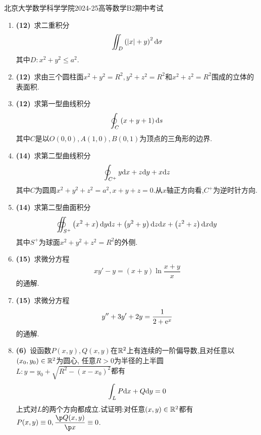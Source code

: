 \documentclass{ctexart}
\begin{document}
\pagestyle{empty}
\begin{center}\Large
    北京大学数学科学学院2024-25高等数学B2期中考试
\end{center}
\begin{enumerate}[leftmargin=*,label=\textbf{\arabic*.}]
    \item \textbf{(12)}\ 求二重积分
    \[\iint_{D}\left(|x|+y\right)^2\mathrm{d}\sigma\]
    其中$D:x^2+y^2\leqslant a^2$.

    \item \textbf{(12)}\ 求由三个圆柱面$x^2+y^2=R^2,y^2+z^2=R^2$和$x^2+z^2=R^2$围成的立体的表面积.

    \item \textbf{(12)}\ 求第一型曲线积分
    \[\oint_C\left(x+y+1\right)\mathrm{d} s\]
    其中$C$是以$O(0,0),A(1,0),B(0,1)$为顶点的三角形的边界.

    \item \textbf{(14)}\ 求第二型曲线积分
    \[\oint_{C^+}y\mathrm{d} x+z\mathrm{d} y+x\mathrm{d} z\]
    其中$C$为圆周$x^2+y^2+z^2=a^2,x+y+z=0$.从$x$轴正方向看,$C^+$为逆时针方向.

    \item \textbf{(14)}\ 求第二型曲面积分
    \[\oiint_{S^+}\left(x^2+x\right)\mathrm{d} y\mathrm{d} z+\left(y^2+y\right)\mathrm{d} z\mathrm{d} x+\left(z^2+z\right)\mathrm{d} x\mathrm{d} y\]
    其中$S^+$为球面$x^2+y^2+z^2=R^2$的外侧.

    \item \textbf{(15)}\ 求微分方程
    \[xy'-y=\left(x+y\right)\ln\dfrac{x+y}{x}\]
    的通解.

    \item \textbf{(15)}\ 求微分方程
    \[y''+3y'+2y=\dfrac{1}{2+\mathrm{e}^x}\]
    的通解.

    \item \textbf{(6)}\ 设函数$P(x,y),Q(x,y)$在$\mathbb{R}^2$上有连续的一阶偏导数,且对任意以$\left(x_0,y_0\right)\in\mathbb{R}^2$为圆心,%
    任意$R>0$为半径的上半圆$L:y=y_0+\sqrt{R^2-\left(x-x_0\right)^2}$都有
    \[\int_LP\mathrm{d} x+Q\mathrm{d} y=0\]
    上式对$L$的两个方向都成立.试证明:对任意$(x,y)\in\mathbb{R}^2$都有$P(x,y)\equiv0,\dfrac{\p Q(x,y)}{\p x}\equiv0$.

\end{enumerate}
\end{document}

